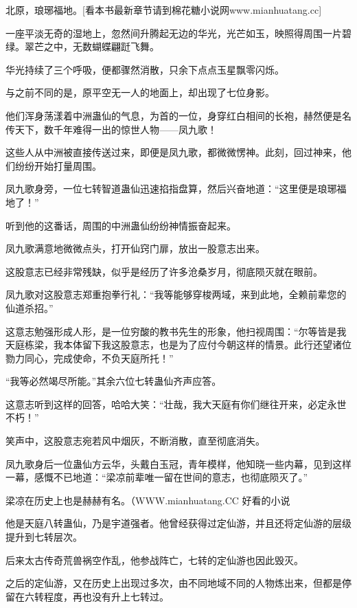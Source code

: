 
\begin{this_body}

北原，琅琊福地。[看本书最新章节请到棉花糖小说网www.mianhuatang.cc]

一座平淡无奇的湿地上，忽然间升腾起无边的华光，光芒如玉，映照得周围一片碧绿。翠芒之中，无数蝴蝶翩跹飞舞。

华光持续了三个呼吸，便都骤然消散，只余下点点玉星飘零闪烁。

与之前不同的是，原平空无一人的地面上，却出现了七位身影。

他们浑身荡漾着中洲蛊仙的气息，为首的一位，身穿红白相间的长袍，赫然便是名传天下，数千年难得一出的惊世人物——凤九歌！

这些人从中洲被直接传送过来，即便是凤九歌，都微微愣神。此刻，回过神来，他们纷纷开始打量周围。

凤九歌身旁，一位七转智道蛊仙迅速掐指盘算，然后兴奋地道：“这里便是琅琊福地了！”

听到他的这番话，周围的中洲蛊仙纷纷神情振奋起来。

凤九歌满意地微微点头，打开仙窍门扉，放出一股意志出来。

这股意志已经非常残缺，似乎是经历了许多沧桑岁月，彻底陨灭就在眼前。

凤九歌对这股意志郑重抱拳行礼：“我等能够穿梭两域，来到此地，全赖前辈您的仙道杀招。”

这意志勉强形成人形，是一位穷酸的教书先生的形象，他扫视周围：“尔等皆是我天庭栋梁，我本体留下我这股意志，也是为了应付今朝这样的情景。此行还望诸位勠力同心，完成使命，不负天庭所托！”

“我等必然竭尽所能。”其余六位七转蛊仙齐声应答。

这意志听到这样的回答，哈哈大笑：“壮哉，我大天庭有你们继往开来，必定永世不朽！”

笑声中，这股意志宛若风中烟灰，不断消散，直至彻底消失。

凤九歌身后一位蛊仙方云华，头戴白玉冠，青年模样，他知晓一些内幕，见到这样一幕，感慨不已地道：“梁凉前辈唯一留在世间的意志，也彻底陨灭了。”

梁凉在历史上也是赫赫有名。（WWW.mianhuatang.CC 好看的小说

他是天庭八转蛊仙，乃是宇道强者。他曾经获得过定仙游，并且还将定仙游的层级提升到七转层次。

后来太古传奇荒兽祸空作乱，他参战阵亡，七转的定仙游也因此毁灭。

之后的定仙游，又在历史上出现过多次，由不同地域不同的人物炼出来，但都是停留在六转程度，再也没有升上七转过。


\end{this_body}
